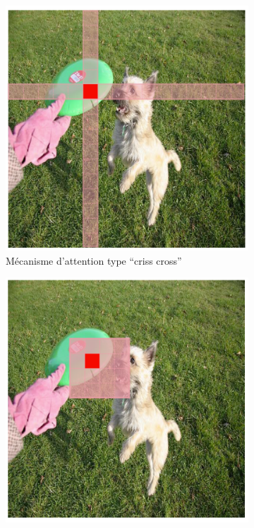 \begin{figure}[H]
    \centering
    \begin{subfigure}[b]{0.30\textwidth}
        \centering
        \includegraphics[width=\textwidth]{02-main/figures/ch2/ch2_yolo_01_attention_area_criss_cross.png}
        \caption{Mécanisme d'attention type ``criss cross''}
        \label{fig:ch2_yolo_01_attention_area_criss_cross}
    \end{subfigure}
    \hfill
    \begin{subfigure}[b]{0.30\textwidth}
        \centering
        \includegraphics[width=\textwidth]{02-main/figures/ch2/ch2_yolo_02_attention_area_window.png}

\end{subfigure}
\end{figure}
